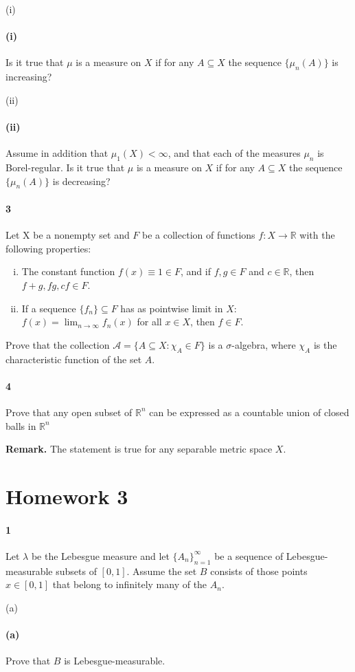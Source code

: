 \documentclass[12pt]{article}
\newlength{\myparskip}
\newenvironment{fullbox}{\begin{lrbox}{\savefullbox}\begin{minipage}{\dimexpr\textwidth-2\fboxsep\relax}\setlength{\parskip}{\myparskip}}{\end{minipage}\end{lrbox}\framebox[\textwidth]{\usebox{\savefullbox}}}
\newenvironment{pbox}[1][]{\begin{fullbox}\ifx#1\empty\else\paragraph{#1}\phantom{}\fi}{\end{fullbox}}
\theoremstyle{definition}
\newcommand{\R}{\mathbb{R}}
\newcommand{\<}{\langle}
\renewcommand{\>}{\rangle}
\renewcommand{\AA}{\mathcal{A}}
\begin{document}
\begin{pbox}[(i)]
    Is it true that $\mu$ is a measure on $X$ if for any $A \subseteq X$ the sequence $\{\mu_n(A)\}$ is increasing?
\end{pbox}

\begin{pbox}[(ii)]
    Assume in addition that $\mu_1(X) < \infty$, and that each of the measures $\mu_n$ is Borel-regular. Is it true that $\mu$ is a measure on $X$ if for any $A \subseteq X$ the sequence $\{\mu_n(A)\}$ is decreasing?
\end{pbox}

\begin{pbox}[3]
    Let X be a nonempty set and $F$ be a collection of functions $f : X \to \R$ with the following properties:
    \begin{enumerate}[(i)]
        \item The constant function $f(x) \equiv 1 \in F$, and if $f, g \in F$ and $c \in \R$, then $f + g, fg, cf \in F$.
        \item If a sequence $\{f_n\} \subseteq F$ has as pointwise limit in $X$: $f(x) = \lim_{n \to \infty} f_n(x)$ for all $x \in X$, then $f \in F$.
    \end{enumerate}
    Prove that the collection $\AA = \{A \subseteq X : \chi_A \in F\}$ is a $\sigma$-algebra, where $\chi_A$ is the characteristic function of the set $A$.
\end{pbox}

\begin{pbox}[4]
    Prove that any open subset of $\R^n$ can be expressed as a countable union of closed balls in $\R^n$

    \textbf{Remark.} The statement is true for any separable metric space $X$.
\end{pbox}

\section*{Homework 3}

\begin{pbox}[1]
    Let $\lambda$ be the Lebesgue measure and let $\{A_n\}_{n=1}^{\infty}$ be a sequence of Lebesgue-measurable subsets of $[0, 1]$. Assume the set $B$ consists of those points $x \in [0, 1]$ that belong to infinitely many of the $A_n$.
\end{pbox}

\begin{pbox}[(a)]
    Prove that $B$ is Lebesgue-measurable.
\end{pbox}
\end{document}
